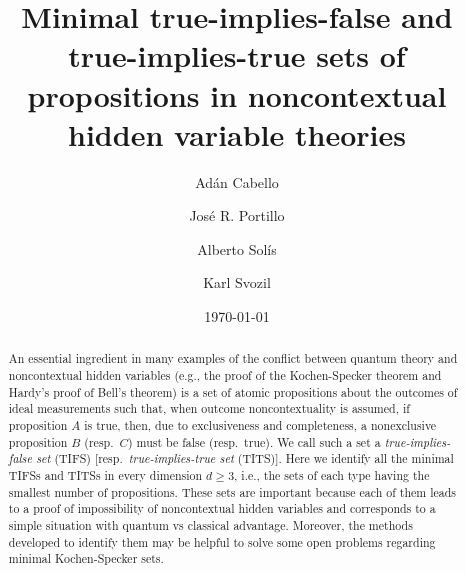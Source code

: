 \documentclass[%
 twocolumn,
 groupedaddress,
 showpacs,
 showkeys,
 preprintnumbers,
 amsmath,amssymb,
 aps,
 pra,
 longbibliography,
 floatfix,
 ]{revtex4-1}
\begin{document}
\newcommand{\karl}[1]{\textcolor{blue}{#1}}
\newcommand{\karllate}[1]{\textcolor{olive}{#1}}
\newcommand{\jr}[1]{\textcolor{venetianred}{#1}}
\newcommand{\meil}[1]{\textcolor{purple}{#1}}



\title{Minimal true-implies-false and true-implies-true sets of propositions in noncontextual hidden variable theories}


\author{Ad\'an Cabello}

\author{Jos\'{e} R. Portillo}

\author{Alberto Sol\'{i}s}

\author{Karl Svozil}


\date{\today}



\begin{abstract}
An essential ingredient in many examples of the conflict between quantum theory and noncontextual hidden variables (e.g.,
the proof of the Kochen-Specker theorem and Hardy's proof of Bell's theorem) is a set of atomic propositions about the outcomes of ideal measurements such that, when outcome noncontextuality is assumed, if proposition $A$ is true, then, due to exclusiveness and completeness, a nonexclusive proposition $B$ (resp.\ $C$) must be false (resp.\ true). We call such a set a {\em true-implies-false set} (TIFS) [resp.\ {\em true-implies-true set} (TITS)]. Here we identify all the minimal TIFSs and TITSs in every dimension $d \ge 3$, i.e., the sets of each type having the smallest number of propositions. These sets are important because each of them leads to a proof of impossibility of noncontextual hidden variables and corresponds to a simple situation with quantum vs classical advantage. Moreover, the methods developed to identify them may be helpful to solve some open problems regarding minimal Kochen-Specker sets.
\end{abstract}
\end{document}
